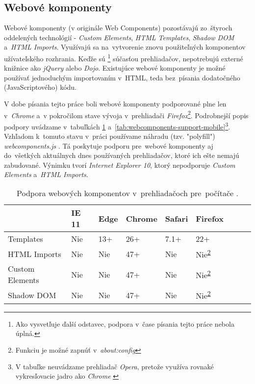 \subsection{Webové komponenty}

Webové komponenty (v originále Web Components) pozostávajú zo~štyroch oddelených technológií - \emph{Custom Elements}, \emph{HTML Templates}, \emph{Shadow DOM} a~\emph{HTML Imports}. Využívajú sa na~vytvorenie znovu použiteľných komponentov užívateľského rozhrania. Keďže sú \footnote{Ako vysvetľuje ďalší odstavec, podpora v~čase písania tejto práce nebola úplná.} súčasťou prehliadačov, nepotrebujú externé knižnice ako \emph{jQuery} alebo \emph{Dojo}. Existujúce webové komponenty je možné používať jednoduchým importovaním v~HTML, teda bez~písania dodatočného (JavaScriptového) kódu. \cite{MDN_WebComponents}

V dobe písania tejto práce boli webové komponenty podporované plne len v~\emph{Chrome} a~v pokročilom stave vývoja v~prehliadači \emph{Firefox}\footnote{Funkciu je možné zapnúť v~\emph{about:config}\label{aboutconfig}}. Podrobnejší popis podpory uvádzame v~tabuľkách \ref{tab:webcomponents-support-desktop} a~\ref{tab:webcomponents-support-mobile}\footnote{V tabuľke neuvádzame prehliadač \emph{Opera}, pretože využíva rovnaké vykresľovacie jadro ako \emph{Chrome} \cite{Opera_History}}. Vzhľadom k~tomuto stavu v~práci používame náhradu (tzv. "polyfill") \emph{webcomponents.js} \cite{Webcomponents_polyfill}. Tá poskytuje podporu pre~webové komponenty aj do~všetkých aktuálnych dnes používaných prehliadačov, ktoré ich ešte nemajú zabudované. Výnimku tvorí \emph{Internet Explorer 10}, ktorý nepodporuje \emph{Custom Elements} a~\emph{HTML Imports}. \cite{Webcomponents_polyfill}


\begin{table}[]
\centering
\begin{tabular}{@{}|l|l|l|l|l|l|l|l|l|@{}}
\toprule
                & IE 11  & Edge & Chrome & Safari & Firefox 								   \\ \midrule
Templates       & Nie    & 13+  & 26+    & 7.1+   & 22+     								   \\ \midrule
HTML Imports    & Nie    & Nie  & 47+    & Nie    & Nie\textsuperscript{\ref{aboutconfig}}    \\ \midrule
Custom Elements & Nie    & Nie  & 47+    & Nie    & Nie\textsuperscript{\ref{aboutconfig}}    \\ \midrule
Shadow DOM      & Nie    & Nie  & 47+    & Nie    & Nie\textsuperscript{\ref{aboutconfig}}    \\ \bottomrule
\end{tabular}
\caption{Podpora webových komponentov v~prehliadačoch pre~počítače \cite{MDN_Template_Element}. \cite{CIU}}
\label{tab:webcomponents-support-desktop}
\end{table}

